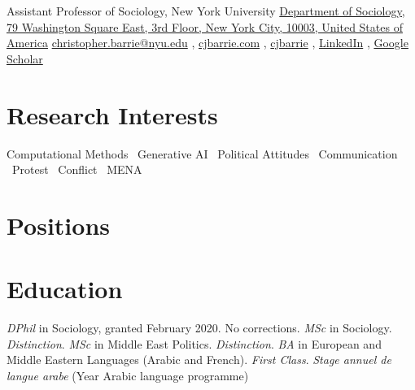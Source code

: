\documentclass{resume}
\begin{document}
  {Assistant Professor of Sociology, New York University}
  {\href{https://maps.app.goo.gl/CAorECG9GbFzpBFB7}{Department of Sociology, 79 Washington Square East, 3rd Floor, New York City, 10003, United States of America}}
  {\iconmail\href{mailto:christopher.barrie@nyu.edu}{christopher.barrie@nyu.edu} \sep
   \iconweb\href{https://cjbarrie.com}{cjbarrie.com} \sep
   \icongithub\href{https://github.com/cjbarrie}{cjbarrie} \sep
   \iconlinkedin\href{https://www.linkedin.com/in/christopher-barrie-741a0455/}{LinkedIn} \sep
   \iconscholar\href{https://scholar.google.com/citations?user=zNU2JxEAAAAJ}{Google Scholar}}

\section{Research Interests}
Computational Methods \textcolor{ink3}{\textperiodcentered} \ Generative AI  \textcolor{ink3}{\textperiodcentered} \ Political Attitudes \textcolor{ink3}{\textperiodcentered}  \  Communication  \textcolor{ink3}{\textperiodcentered} \ Protest \textcolor{ink3}{\textperiodcentered} \ Conflict \textcolor{ink3}{\textperiodcentered} \ MENA

\section{Positions}



\section{Education}
\textit{DPhil} in Sociology, granted February 2020. No corrections.
\textit{MSc} in Sociology. \textit{Distinction}.
\textit{MSc} in Middle East Politics. \textit{Distinction}.
\textit{BA} in European and Middle Eastern Languages (Arabic and French). \textit{First Class}.
\textit{Stage annuel de langue arabe} (Year Arabic language programme)
\end{document}
